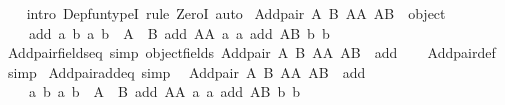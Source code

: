 \begin{isabellebody}
%
\isadelimproof
\ \ %
\endisadelimproof
%
\isatagproof
{}\isamarkupfalse%
\ {\isacharparenleft}{\kern0pt}intro\ Dep{\isacharunderscore}{\kern0pt}fun{\isacharunderscore}{\kern0pt}typeI{\isacharcomma}{\kern0pt}\ rule\ ZeroI{\isacharparenright}{\kern0pt}\ auto%
\endisatagproof
{\isafoldproof}%
%
\isadelimproof
\isanewline
%
\endisadelimproof
\isanewline
{}\isamarkupfalse%
\ {\isachardoublequoteopen}Add{\isacharunderscore}{\kern0pt}pair\ A\ B\ AA\ AB\ {\isasymequiv}\ object\ {\isacharbraceleft}{\kern0pt}\isanewline
\ \ \ \ {\isasymlangle}{\isacharat}{\kern0pt}add{\isacharcomma}{\kern0pt}\ {\isasymlambda}{\isasymlangle}a{}{\isacharcomma}{\kern0pt}\ b{}{\isasymrangle}\ {\isasymlangle}a{}{\isacharcomma}{\kern0pt}\ b{}{\isasymrangle}\ {\isasymin}\ A\ {\isasymtimes}\ B{\isachardot}{\kern0pt}\ {\isasymlangle}add\ AA\ a{}\ a{}{\isacharcomma}{\kern0pt}\ add\ AB\ b{}\ b{}{\isasymrangle}{\isasymrangle}\isanewline
\ \ {\isacharbraceright}{\kern0pt}{\isachardoublequoteclose}\isanewline
\isanewline
\isanewline
{}\isamarkupfalse%
\ Add{\isacharunderscore}{\kern0pt}pair{\isacharunderscore}{\kern0pt}fields{\isacharunderscore}{\kern0pt}eq\ {\isacharbrackleft}{\kern0pt}simp{\isacharbrackright}{\kern0pt}{\isacharcolon}{\kern0pt}\ {\isachardoublequoteopen}object{\isacharunderscore}{\kern0pt}fields\ {\isacharparenleft}{\kern0pt}Add{\isacharunderscore}{\kern0pt}pair\ A\ B\ AA\ AB{\isacharparenright}{\kern0pt}\ {\isacharequal}{\kern0pt}\ {\isacharbraceleft}{\kern0pt}{\isacharat}{\kern0pt}add{\isacharbraceright}{\kern0pt}{\isachardoublequoteclose}\isanewline
%
\isadelimproof
\ \ %
\endisadelimproof
%
\isatagproof
{}\isamarkupfalse%
\ Add{\isacharunderscore}{\kern0pt}pair{\isacharunderscore}{\kern0pt}def\ \isamarkupfalse%
\ simp%
\endisatagproof
{\isafoldproof}%
%
\isadelimproof
\isanewline
%
\endisadelimproof
\isanewline
{}\isamarkupfalse%
\ Add{\isacharunderscore}{\kern0pt}pair{\isacharunderscore}{\kern0pt}add{\isacharunderscore}{\kern0pt}eq\ {\isacharbrackleft}{\kern0pt}simp{\isacharbrackright}{\kern0pt}{\isacharcolon}{\kern0pt}\isanewline
\ \ {\isachardoublequoteopen}{\isacharparenleft}{\kern0pt}Add{\isacharunderscore}{\kern0pt}pair\ A\ B\ AA\ AB{\isacharparenright}{\kern0pt}\ {\isacharat}{\kern0pt}{\isacharat}{\kern0pt}\ add\ {\isacharequal}{\kern0pt}\isanewline
\ \ \ \ {\isasymlambda}{\isasymlangle}a{}{\isacharcomma}{\kern0pt}\ b{}{\isasymrangle}\ {\isasymlangle}a{}{\isacharcomma}{\kern0pt}\ b{}{\isasymrangle}\ {\isasymin}\ A\ {\isasymtimes}\ B{\isachardot}{\kern0pt}\ {\isasymlangle}add\ AA\ a{}\ a{}{\isacharcomma}{\kern0pt}\ add\ AB\ b{}\ b{}{\isasymrangle}{\isachardoublequoteclose}\isanewline

\end{isabellebody}
